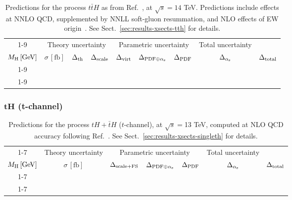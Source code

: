 \begin{table}[ht!]
\caption{\label{tab:tth-tot14} Predictions for the process $t\bar tH$ as from Ref.~\cite{Balsach:2025jcw}, at $\sqrt{s} = 14$ TeV. Predictions include effects at
NNLO QCD, supplemented by NNLL soft-gluon resummation, and NLO effects of EW origin~\cite{Frixione:2014qaa,Frixione:2015zaa,Kulesza:2015vda,Broggio:2015lya,Broggio:2016lfj,
Kulesza:2017ukk,Frederix:2018nkq,Kulesza:2018tqz,Broggio:2019ewu,Kulesza:2020nfh,
Catani:2022mfv,Devoto:2024nhl}. See Sect.~\ref{sec:results-xsects-tth} for details.}
\centering
\scriptsize
{\renewcommand{\arraystretch}{1.4}
\begin{tabular}{| cc | ccc | ccc | c |}
\cline{1-9}
\multicolumn{2}{|c|}{\(\sqrt{s} = 14\,\mathrm{TeV}\)} &
\multicolumn{3}{|c|}{Theory uncertainty} &
\multicolumn{3}{|c|}{Parametric uncertainty} &
\multicolumn{1}{c|}{Total uncertainty} \\
\(M_\mathrm{H}\,[\mathrm{GeV}]\) & \(\sigma\,[\mathrm{fb}]\) &
\(\Delta_{\rm th}\) &
{\color{black!55}\(\Delta_{\rm scale}\)} & {\color{black!55}\(\Delta_{\rm virt}\)} &
\(\Delta_{{\rm PDF}\oplus\alpha_{\mathrm{s}}}\) &
{\color{black!55}\(\Delta_{\rm PDF}\)} & {\color{black!55}\(\Delta_{\alpha_{\mathrm{s}}}\)} &
\(\Delta_{\rm total}\)
\\
\cline{1-9}
 \\
\cline{1-9}
\end{tabular}
}
\end{table}

\FloatBarrier
\subsubsection{\texorpdfstring{$\boldsymbol{tH}$}{tH} (t-channel)}

\begin{table}[ht!]
\caption{\label{tab:th-t-tot13} Predictions for the process $tH + \bar t H$ ($t$-channel), at $\sqrt{s}=$13 TeV, computed at NLO QCD accuracy following Ref.~\cite{Demartin:2015uha}. See Sect.~\ref{sec:results-xsects-singleth} for details.}
\centering
\scriptsize
{\renewcommand{\arraystretch}{1.4}
\begin{tabular}{| cc | c | ccc | c |}
\cline{1-7}
\multicolumn{2}{|c|}{\(\sqrt{s} = 13\,\mathrm{TeV}\)} &
\multicolumn{1}{|c|}{Theory uncertainty} &
\multicolumn{3}{|c|}{Parametric uncertainty} &
\multicolumn{1}{c|}{Total uncertainty} \\
\(M_\mathrm{H}\,[\mathrm{GeV}]\) & \(\sigma\,[\mathrm{fb}]\) &
\(\Delta_{\rm scale+\textrm{FS}}\) &
\(\Delta_{{\rm PDF}\oplus\alpha_{\mathrm{s}}}\) &
{\color{black!55}\(\Delta_{\rm PDF}\)} & {\color{black!55}\(\Delta_{\alpha_{\mathrm{s}}}\)} &
\(\Delta_{\rm total}\)
\\
\cline{1-7}
 \\
\cline{1-7}
\end{tabular}
}
\end{table}

